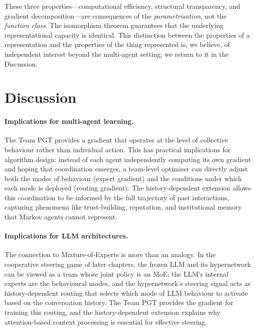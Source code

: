 These three properties---computational efficiency, structural transparency, and gradient decomposition---are consequences of the \emph{parametrisation}, not the \emph{function class}. The isomorphism theorem guarantees that the underlying representational capacity is identical. This distinction between the properties of a representation and the properties of the thing represented is, we believe, of independent interest beyond the multi-agent setting; we return to it in the Discussion.

\section{Discussion}
\label{sec:ch7-discussion}

\paragraph{Implications for multi-agent learning.} The Team PGT provides a gradient that operates at the level of collective behaviour rather than individual action. This has practical implications for algorithm design: instead of each agent independently computing its own gradient and hoping that coordination emerges, a team-level optimiser can directly adjust both the modes of behaviour (expert gradient) and the conditions under which each mode is deployed (routing gradient). The history-dependent extension allows this coordination to be informed by the full trajectory of past interactions, capturing phenomena like trust-building, reputation, and institutional memory that Markov agents cannot represent.

\paragraph{Implications for LLM architectures.} The connection to Mixture-of-Experts is more than an analogy. In the cooperative steering game of later chapters, the frozen LLM and its hypernetwork can be viewed as a team whose joint policy is an MoE: the LLM's internal experts are the behavioural modes, and the hypernetwork's steering signal acts as history-dependent routing that selects which mode of LLM behaviour to activate based on the conversation history. The Team PGT provides the gradient for training this routing, and the history-dependent extension explains why attention-based context processing is essential for effective steering.

